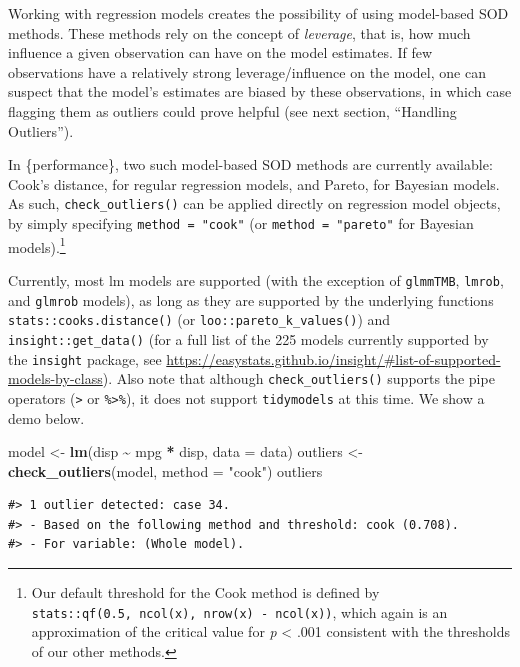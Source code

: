 \documentclass[sn-basic, lineno,pdflatex]{sn-jnl}
\newenvironment{Shaded}{\begin{snugshade}}{\end{snugshade}}
\newcommand{\AttributeTok}[1]{\textcolor[rgb]{0.13,0.29,0.53}{#1}}
\newcommand{\FunctionTok}[1]{\textcolor[rgb]{0.13,0.29,0.53}{\textbf{#1}}}
\newcommand{\NormalTok}[1]{#1}
\newcommand{\OtherTok}[1]{\textcolor[rgb]{0.56,0.35,0.01}{#1}}
\newcommand{\SpecialCharTok}[1]{\textcolor[rgb]{0.81,0.36,0.00}{\textbf{#1}}}
\newcommand{\StringTok}[1]{\textcolor[rgb]{0.31,0.60,0.02}{#1}}
\begin{document}
Working with regression models creates the possibility of using
model-based SOD methods. These methods rely on the concept of
\emph{leverage}, that is, how much influence a given observation can
have on the model estimates. If few observations have a relatively
strong leverage/influence on the model, one can suspect that the model's
estimates are biased by these observations, in which case flagging them
as outliers could prove helpful (see next section, ``Handling
Outliers'').

In \{performance\}, two such model-based SOD methods are currently
available: Cook's distance, for regular regression models, and Pareto,
for Bayesian models. As such, \texttt{check\_outliers()} can be applied
directly on regression model objects, by simply specifying
\texttt{method\ =\ "cook"} (or \texttt{method\ =\ "pareto"} for Bayesian
models).\footnote{Our default threshold for the Cook method is defined
  by \texttt{stats::qf(0.5,\ ncol(x),\ nrow(x)\ -\ ncol(x))}, which
  again is an approximation of the critical value for \emph{p}
  \textless{} .001 consistent with the thresholds of our other methods.}

Currently, most lm models are supported (with the exception of
\texttt{glmmTMB}, \texttt{lmrob}, and \texttt{glmrob} models), as long
as they are supported by the underlying functions
\texttt{stats::cooks.distance()} (or \texttt{loo::pareto\_k\_values()})
and \texttt{insight::get\_data()} (for a full list of the 225 models
currently supported by the \texttt{insight} package, see
\url{https://easystats.github.io/insight/\#list-of-supported-models-by-class}).
Also note that although \texttt{check\_outliers()} supports the pipe
operators (\texttt{\textbar{}\textgreater{}} or
\texttt{\%\textgreater{}\%}), it does not support \texttt{tidymodels} at
this time. We show a demo below.

\begin{Shaded}
\begin{Highlighting}[]
\NormalTok{model }\OtherTok{\textless{}{-}} \FunctionTok{lm}\NormalTok{(disp }\SpecialCharTok{\textasciitilde{}}\NormalTok{ mpg }\SpecialCharTok{*}\NormalTok{ disp, }\AttributeTok{data =}\NormalTok{ data)}
\NormalTok{outliers }\OtherTok{\textless{}{-}} \FunctionTok{check\_outliers}\NormalTok{(model, }\AttributeTok{method =} \StringTok{"cook"}\NormalTok{)}
\NormalTok{outliers}
\end{Highlighting}
\end{Shaded}

\begin{verbatim}
#> 1 outlier detected: case 34.
#> - Based on the following method and threshold: cook (0.708).
#> - For variable: (Whole model).
\end{verbatim}
\end{document}
